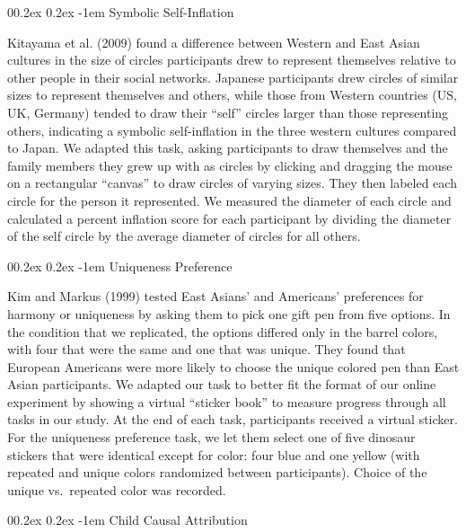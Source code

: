 \documentclass[
  man,floatsintext]{apa6}
\makeatletter
\let\oldparagraph\paragraph
\renewcommand{\paragraph}[1]{\oldparagraph{#1}\mbox{}}
\renewcommand{\paragraph}{\@startsection{paragraph}{4}{\parindent}%
  {0\baselineskip \@plus 0.2ex \@minus 0.2ex}%
  {-1em}%
  {\normalfont\normalsize\bfseries\itshape\typesectitle}}
\makeatother
\begin{document}
\hypertarget{symbolic-self-inflation}{%
\paragraph{Symbolic Self-Inflation}\label{symbolic-self-inflation}}

Kitayama et al. (2009) found a difference between Western and East Asian cultures in the size of circles participants drew to represent themselves relative to other people in their social networks. Japanese participants drew circles of similar sizes to represent themselves and others, while those from Western countries (US, UK, Germany) tended to draw their ``self'' circles larger than those representing others, indicating a symbolic self-inflation in the three western cultures compared to Japan. We adapted this task, asking participants to draw themselves and the family members they grew up with as circles by clicking and dragging the mouse on a rectangular ``canvas'' to draw circles of varying sizes. They then labeled each circle for the person it represented. We measured the diameter of each circle and calculated a percent inflation score for each participant by dividing the diameter of the self circle by the average diameter of circles for all others.

\hypertarget{uniqueness-preference}{%
\paragraph{Uniqueness Preference}\label{uniqueness-preference}}

Kim and Markus (1999) tested East Asians' and Americans' preferences for harmony or uniqueness by asking them to pick one gift pen from five options. In the condition that we replicated, the options differed only in the barrel colors, with four that were the same and one that was unique. They found that European Americans were more likely to choose the unique colored pen than East Asian participants. We adapted our task to better fit the format of our online experiment by showing a virtual ``sticker book'' to measure progress through all tasks in our study. At the end of each task, participants received a virtual sticker. For the uniqueness preference task, we let them select one of five dinosaur stickers that were identical except for color: four blue and one yellow (with repeated and unique colors randomized between participants). Choice of the unique vs.~repeated color was recorded.

\hypertarget{child-causal-attribution}{%
\paragraph{Child Causal Attribution}\label{child-causal-attribution}}
\end{document}
